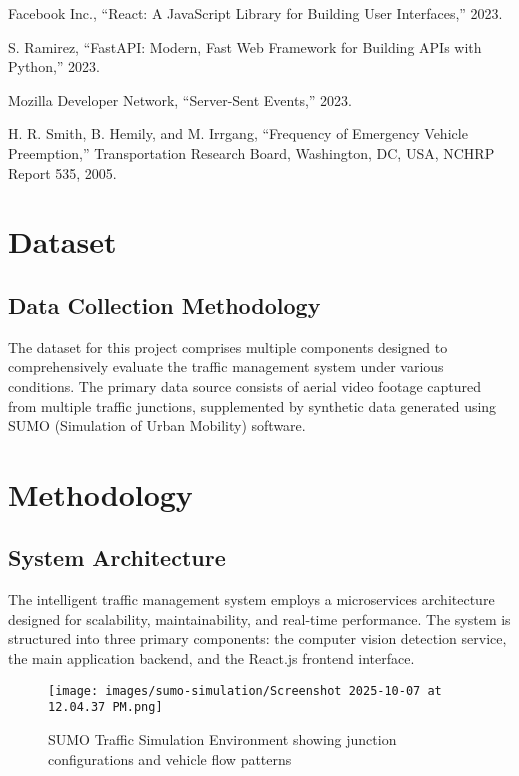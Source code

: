 \documentclass[conference]{IEEEtran}
\begin{document}
\begin{thebibliography}{20}
Facebook Inc., ``React: A JavaScript Library for Building User Interfaces,'' 2023.

S. Ramirez, ``FastAPI: Modern, Fast Web Framework for Building APIs with Python,'' 2023.

Mozilla Developer Network, ``Server-Sent Events,'' 2023.

H. R. Smith, B. Hemily, and M. Irrgang, ``Frequency of Emergency Vehicle Preemption,'' Transportation Research Board, Washington, DC, USA, NCHRP Report 535, 2005.

\end{thebibliography}

\section{Dataset}

\subsection{Data Collection Methodology}

The dataset for this project comprises multiple components designed to comprehensively evaluate the traffic management system under various conditions. The primary data source consists of aerial video footage captured from multiple traffic junctions, supplemented by synthetic data generated using SUMO (Simulation of Urban Mobility) software.

\section{Methodology}

\subsection{System Architecture}

The intelligent traffic management system employs a microservices architecture designed for scalability, maintainability, and real-time performance. The system is structured into three primary components: the computer vision detection service, the main application backend, and the React.js frontend interface.

\begin{figure}[H]
\centering
\texttt{[image: images/sumo-simulation/Screenshot 2025-10-07 at 12.04.37 PM.png]}
\caption{SUMO Traffic Simulation Environment showing junction configurations and vehicle flow patterns}
\label{fig:sumo_simulation_2}
\end{figure}
\end{document}
